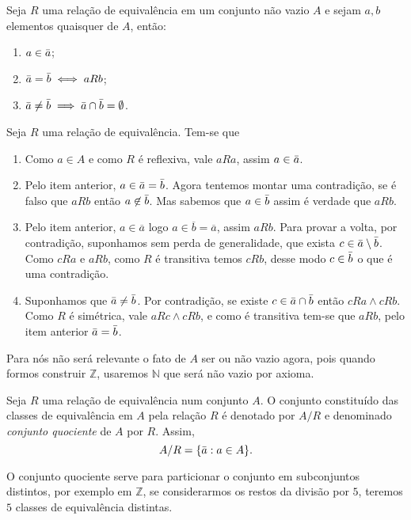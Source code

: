 \documentclass[../main.tex]{subfiles}
\begin{document}
\begin{teo}
    Seja $R$ uma relação de equivalência em um conjunto não vazio $A$ e sejam $a,b$ elementos quaisquer de $A$, então:
    \begin{enumerate}[label=(\roman*)]
        \item $a \in \Bar{a}$;
        \item $\Bar{a} = \Bar{b} \iff aRb$;
        \item $\Bar{a} \neq \Bar{b} \implies \Bar{a} \cap \Bar{b} = \emptyset $.
    \end{enumerate}
\end{teo}

\begin{dem}
    Seja $R$ uma relação de equivalência. Tem-se que
    \begin{enumerate}[label=(\roman*)]
        \item Como $a \in A$ e como $R$ é reflexiva, vale $aRa$, assim $a \in \Bar{a}$.
        \item Pelo item anterior, $a \in \Bar{a} = \Bar{b}$. 
        Agora tentemos montar uma contradição, se é falso que $aRb$ então $a \not\in \Bar{b}$. Mas sabemos que $a \in \Bar{b}$ assim é verdade que $aRb$. 
        \item Pelo item anterior, $a \in \overline{a}$ logo $a \in \overline{b} = \overline{a}$, assim $aRb$. Para provar a volta, por contradição, suponhamos sem perda de generalidade, que exista $c \in \Bar{a} \setminus \Bar{b}$. Como $cRa$ e $aRb$, como $R$ é transitiva temos $cRb$, desse modo $c \in \Bar{b}$ o que é uma contradição.
        \item Suponhamos que $\Bar{a} \neq \Bar{b}$. Por contradição, se existe $c \in \Bar{a} \cap \Bar{b}$ então $cRa \land cRb$. Como  $R$ é simétrica, vale $aRc \land cRb$, e como é transitiva tem-se que $aRb$, pelo item anterior $\Bar{a} = \Bar{b}$.
    \end{enumerate}
\end{dem}
Para nós não será relevante o fato de $A$ ser ou não vazio agora, pois quando formos construir $\mathbb{Z}$, usaremos $\mathbb{N}$ que será não vazio por axioma. 

\begin{defi}\label{agb-def-conjQuoc}
    Seja $R$ uma relação de equivalência num conjunto $A$. O conjunto constituído das classes de equivalência em $A$ pela relação $R$ é denotado por $A / R$ e denominado \emph{conjunto quociente} de $A$ por $R$. Assim, 
    \[ A / R = \{\Bar{a} : a \in A\}. \]
    
\end{defi}
O conjunto quociente serve para particionar o conjunto em subconjuntos distintos, por exemplo em $\mathbb{Z}$, se considerarmos os restos da divisão por $5$, teremos $5$ classes de equivalência distintas.  
\end{document}
